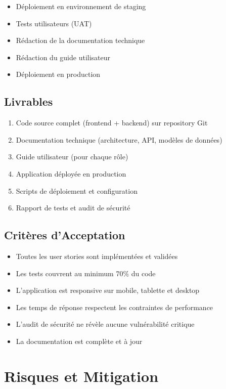 \documentclass[12pt,a4paper]{article}
\begin{document}
\begin{itemize}[leftmargin=*]
    \item Déploiement en environnement de staging
    \item Tests utilisateurs (UAT)
    \item Rédaction de la documentation technique
    \item Rédaction du guide utilisateur
    \item Déploiement en production
\end{itemize}

\subsection{Livrables}

\begin{enumerate}[leftmargin=*]
    \item Code source complet (frontend + backend) sur repository Git
    \item Documentation technique (architecture, API, modèles de données)
    \item Guide utilisateur (pour chaque rôle)
    \item Application déployée en production
    \item Scripts de déploiement et configuration
    \item Rapport de tests et audit de sécurité
\end{enumerate}

\subsection{Critères d'Acceptation}

\begin{itemize}[leftmargin=*]
    \item Toutes les user stories sont implémentées et validées
    \item Les tests couvrent au minimum 70\% du code
    \item L'application est responsive sur mobile, tablette et desktop
    \item Les temps de réponse respectent les contraintes de performance
    \item L'audit de sécurité ne révèle aucune vulnérabilité critique
    \item La documentation est complète et à jour
\end{itemize}

\section{Risques et Mitigation}
\end{document}
